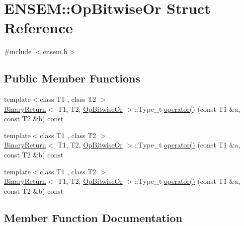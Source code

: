 \hypertarget{structENSEM_1_1OpBitwiseOr}{}\section{E\+N\+S\+EM\+:\+:Op\+Bitwise\+Or Struct Reference}
\label{structENSEM_1_1OpBitwiseOr}


{\ttfamily \#include $<$ensem.\+h$>$}

\subsection*{Public Member Functions}
\begin{DoxyCompactItemize}
\item 
{\footnotesize template$<$class T1 , class T2 $>$ }\\\mbox{\hyperlink{structENSEM_1_1BinaryReturn}{Binary\+Return}}$<$ T1, T2, \mbox{\hyperlink{structENSEM_1_1OpBitwiseOr}{Op\+Bitwise\+Or}} $>$\+::Type\+\_\+t \mbox{\hyperlink{structENSEM_1_1OpBitwiseOr_ad773d2df54ccbb80a46a0cd83b9ce226}{operator()}} (const T1 \&a, const T2 \&b) const
\item 
{\footnotesize template$<$class T1 , class T2 $>$ }\\\mbox{\hyperlink{structENSEM_1_1BinaryReturn}{Binary\+Return}}$<$ T1, T2, \mbox{\hyperlink{structENSEM_1_1OpBitwiseOr}{Op\+Bitwise\+Or}} $>$\+::Type\+\_\+t \mbox{\hyperlink{structENSEM_1_1OpBitwiseOr_ad773d2df54ccbb80a46a0cd83b9ce226}{operator()}} (const T1 \&a, const T2 \&b) const
\item 
{\footnotesize template$<$class T1 , class T2 $>$ }\\\mbox{\hyperlink{structENSEM_1_1BinaryReturn}{Binary\+Return}}$<$ T1, T2, \mbox{\hyperlink{structENSEM_1_1OpBitwiseOr}{Op\+Bitwise\+Or}} $>$\+::Type\+\_\+t \mbox{\hyperlink{structENSEM_1_1OpBitwiseOr_ad773d2df54ccbb80a46a0cd83b9ce226}{operator()}} (const T1 \&a, const T2 \&b) const
\end{DoxyCompactItemize}


\subsection{Member Function Documentation}
\mbox{\label{structENSEM_1_1OpBitwiseOr_ad773d2df54ccbb80a46a0cd83b9ce226}} 
